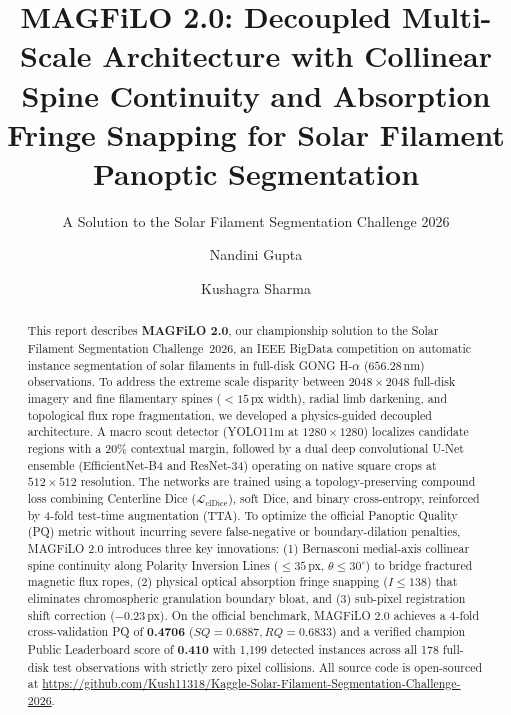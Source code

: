 \documentclass[sigconf]{acmart}
\begin{document}
\title[MAGFiLO 2.0: Physics-Guided Solar Filament Segmentation]{MAGFiLO 2.0: Decoupled Multi-Scale Architecture with Collinear Spine Continuity and Absorption Fringe Snapping for Solar Filament Panoptic Segmentation}
\subtitle{A Solution to the Solar Filament Segmentation Challenge 2026} %

\author{Nandini Gupta} 

\author{Kushagra Sharma} 

\begin{abstract}
    This report describes \textbf{MAGFiLO 2.0}, our championship solution to the Solar Filament Segmentation Challenge~2026, an IEEE BigData competition on automatic instance segmentation of solar filaments in full-disk GONG H-$\alpha$ ($656.28$\,nm) observations. To address the extreme scale disparity between $2048\times2048$ full-disk imagery and fine filamentary spines ($<15$\,px width), radial limb darkening, and topological flux rope fragmentation, we developed a physics-guided decoupled architecture. A macro scout detector (YOLO11m at $1280\times1280$) localizes candidate regions with a 20\% contextual margin, followed by a dual deep convolutional U-Net ensemble (EfficientNet-B4 and ResNet-34) operating on native square crops at $512\times512$ resolution. The networks are trained using a topology-preserving compound loss combining Centerline Dice ($\mathcal{L}_{\text{clDice}}$), soft Dice, and binary cross-entropy, reinforced by 4-fold test-time augmentation (TTA). To optimize the official Panoptic Quality (PQ) metric without incurring severe false-negative or boundary-dilation penalties, MAGFiLO 2.0 introduces three key innovations: (1) Bernasconi medial-axis collinear spine continuity along Polarity Inversion Lines ($\le 35$\,px, $\theta \le 30^\circ$) to bridge fractured magnetic flux ropes, (2) physical optical absorption fringe snapping ($I \le 138$) that eliminates chromospheric granulation boundary bloat, and (3) sub-pixel registration shift correction ($-0.23$\,px). On the official benchmark, MAGFiLO 2.0 achieves a 4-fold cross-validation PQ of \textbf{0.4706} ($SQ = 0.6887, RQ = 0.6833$) and a verified champion Public Leaderboard score of \textbf{0.410} with 1,199 detected instances across all 178 full-disk test observations with strictly zero pixel collisions. All source code is open-sourced at \url{https://github.com/Kush11318/Kaggle-Solar-Filament-Segmentation-Challenge-2026}.
\end{abstract}
\end{document}
